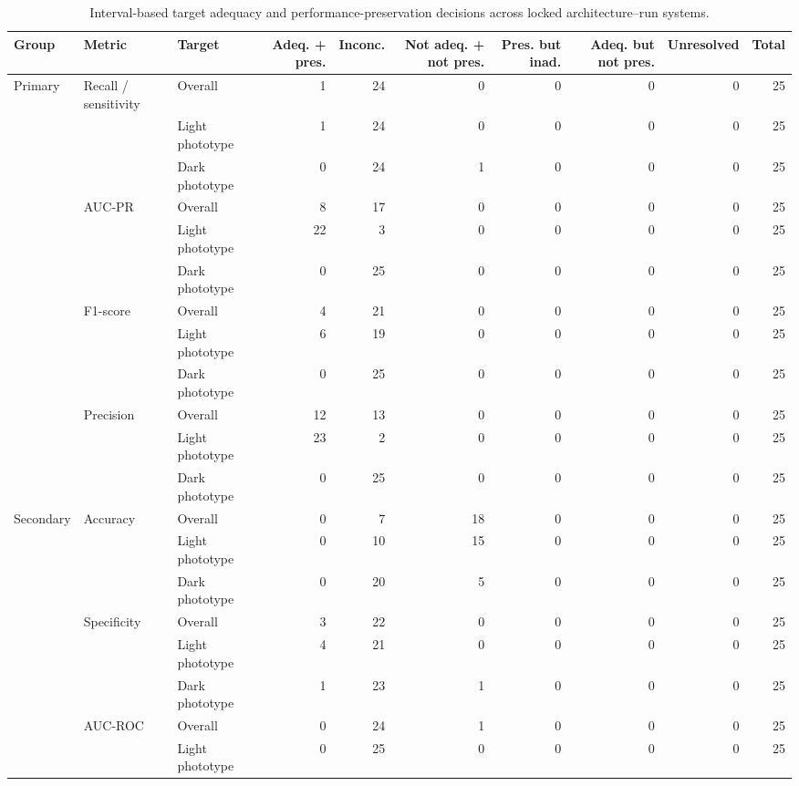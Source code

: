 \begin{table}[h!]
\centering
\scriptsize
\caption{Interval-based target adequacy and performance-preservation decisions across locked architecture--run systems.}
\label{tab:interval-tac-etc-consistency}
\setlength{\tabcolsep}{3pt}
\renewcommand{\arraystretch}{1.08}
\begin{tabular}{lllrrrrrrr}
\toprule
\textbf{Group} & \textbf{Metric} & \textbf{Target} & \textbf{Adeq. + pres.} & \textbf{Inconc.} & \textbf{Not adeq. + not pres.} & \textbf{Pres. but inad.} & \textbf{Adeq. but not pres.} & \textbf{Unresolved} & \textbf{Total} \\
\midrule
Primary & Recall / sensitivity & Overall & 1 & 24 & 0 & 0 & 0 & 0 & 25 \\
 &  & Light phototype & 1 & 24 & 0 & 0 & 0 & 0 & 25 \\
 &  & Dark phototype & 0 & 24 & 1 & 0 & 0 & 0 & 25 \\
\addlinespace
 & AUC-PR & Overall & 8 & 17 & 0 & 0 & 0 & 0 & 25 \\
 &  & Light phototype & 22 & 3 & 0 & 0 & 0 & 0 & 25 \\
 &  & Dark phototype & 0 & 25 & 0 & 0 & 0 & 0 & 25 \\
\addlinespace
 & F1-score & Overall & 4 & 21 & 0 & 0 & 0 & 0 & 25 \\
 &  & Light phototype & 6 & 19 & 0 & 0 & 0 & 0 & 25 \\
 &  & Dark phototype & 0 & 25 & 0 & 0 & 0 & 0 & 25 \\
\addlinespace
 & Precision & Overall & 12 & 13 & 0 & 0 & 0 & 0 & 25 \\
 &  & Light phototype & 23 & 2 & 0 & 0 & 0 & 0 & 25 \\
 &  & Dark phototype & 0 & 25 & 0 & 0 & 0 & 0 & 25 \\
\addlinespace
Secondary & Accuracy & Overall & 0 & 7 & 18 & 0 & 0 & 0 & 25 \\
 &  & Light phototype & 0 & 10 & 15 & 0 & 0 & 0 & 25 \\
 &  & Dark phototype & 0 & 20 & 5 & 0 & 0 & 0 & 25 \\
\addlinespace
 & Specificity & Overall & 3 & 22 & 0 & 0 & 0 & 0 & 25 \\
 &  & Light phototype & 4 & 21 & 0 & 0 & 0 & 0 & 25 \\
 &  & Dark phototype & 1 & 23 & 1 & 0 & 0 & 0 & 25 \\
\addlinespace
 & AUC-ROC & Overall & 0 & 24 & 1 & 0 & 0 & 0 & 25 \\
 &  & Light phototype & 0 & 25 & 0 & 0 & 0 & 0 & 25 \\

\end{tabular}
\end{table}
